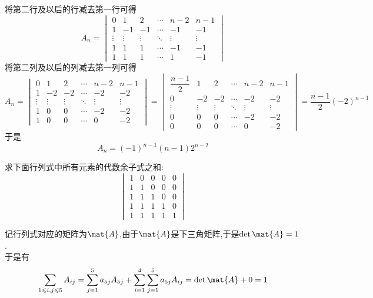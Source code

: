 \documentclass{ctexart}
\begin{document}
\begin{solution}
    将第二行及以后的行减去第一行可得
    \[A_n=\begin{vmatrix}
        0&1&2&\cdots&n-2&n-1\\
        1&-1&-1&\cdots&-1&-1\\
        \vdots&\vdots&\vdots&\ddots&\vdots&\vdots\\
        1&1&1&\cdots&-1&-1\\
        1&1&1&\cdots&1&-1
    \end{vmatrix}\]
    将第二列及以后的列减去第一列可得
    \[A_n=\begin{vmatrix}
        0&1&2&\cdots&n-2&n-1\\
        1&-2&-2&\cdots&-2&-2\\
        \vdots&\vdots&\vdots&\ddots&\vdots&\vdots\\
        1&0&0&\cdots&-2&-2\\
        1&0&0&\cdots&0&-2
    \end{vmatrix}=\begin{vmatrix}
        \dfrac{n-1}{2}&1&2&\cdots&n-2&n-1\\
        0&-2&-2&\cdots&-2&-2\\
        \vdots&\vdots&\vdots&\ddots&\vdots&\vdots\\
        0&0&0&\cdots&-2&-2\\
        0&0&0&\cdots&0&-2
    \end{vmatrix}=\dfrac{n-1}{2}(-2)^{n-1}\]
    于是
    \[A_n=(-1)^{n-1}(n-1)2^{n-2}\]
\end{solution}
\begin{homework}[4(13')]
    求下面行列式中所有元素的代数余子式之和:
    \[\begin{vmatrix}
        1&0&0&0&0\\
        1&1&0&0&0\\
        1&1&1&0&0\\
        1&1&1&1&0\\
        1&1&1&1&1
    \end{vmatrix}\]
\end{homework}
\begin{solution}
    记行列式对应的矩阵为$\mat{A}$,由于$\mat{A}$是下三角矩阵,于是$\det\mat{A}=1$.\\
    于是有
    \[\sum_{1\leqslant i,j\leqslant 5}A_{ij}=\sum_{j=1}^{5}a_{5j}A_{5j}+\sum_{i=1}^{4}\sum_{j=1}^{5}a_{5j}A_{ij}=\det\mat{A}+0=1\]
\end{solution}
\end{document}
